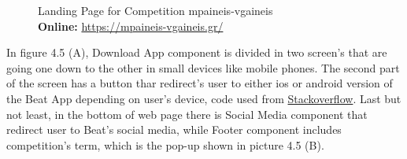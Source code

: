 \begin{figure}[H]
	\centering
	\qquad
	\caption{
		Landing Page for Competition mpaineis-vgaineis
		\\
		\textbf{Online: } \url{https://mpaineis-vgaineis.gr/}
	}
	\label{fig:example}
\end{figure}

In figure 4.5 (A), Download App component is divided in two screen's that are going one down to the other in small devices like mobile phones. The second part of the screen has a button thar redirect's user to either ios or android version of the Beat App depending on user's device, code used from \href{https://l.facebook.com/l.php?u=https\%3A\%2F\%2Fstackoverflow.com\%2Fquestions\%2F38241480\%2Fdetect-macos-ios-windows-android-and-linux-os-with-js\%3Ffbclid\%3DIwAR3uoMdkjVLP4sYZwZYNdWZvnU6ZENl_ydezZUYBDrDXcAuMZ7TKWHR1_rs\&h=AT106TjLH1q4m5FXvHR8F5OLOxARMZ07jIj0a5JeCLWiptBV09H1oPWquvUAykdDj_jEyBSwHwd_ELvKjCUjKGg5FkErIz0jFkG_QK8vfVCOOJfxAjxHPj11YPc4-Jf8JFgCjA}{Stackoverflow}. Last but not least, in the bottom of web page there is Social Media component that redirect user to Beat's social media, while Footer component includes competition's term, which is the pop-up shown in picture 4.5 (B).


